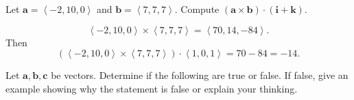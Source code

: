 \documentclass[12pt]{exam}
\newcommand{\ba}{\bm{a}}
\newcommand{\bb}{\bm{b}}
\newcommand{\bc}{\bm{c}}
\newcommand{\gen}[1]{\left\langle #1 \right\rangle}
\begin{document}
\begin{questions}
\question Let \(\ba=\gen{-2,10,0}\) and \(\bb=\gen{7,7,7}\). Compute \((\ba\times\bb)\cdot (\bm{i}+\bm{k})\).

\ifprintanswers
        \begin{solution}
            \[
                \gen{-2,10,0}\times\gen{7,7,7}=\gen{70,14,-84}.
            \]
            Then 
            \[
              (\gen{-2,10,0}\times\gen{7,7,7})\cdot\gen{1,0,1}=70-84=-14.
            \]
        \end{solution}
    \else
        \vfill
    \fi    

\question Let \(\ba,\bb,\bc\) be vectors. Determine if the following are true or false. If false, give an example showing why the statement is false or explain your thinking.




\end{questions}
\end{document}
